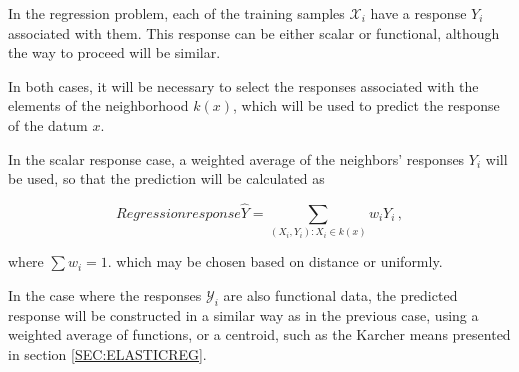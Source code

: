 In the regression problem, each of the training samples $\mathcal{X}_i$ have a
response $Y_i$ associated with them. This response can be either scalar or
functional, although the way to proceed will be similar.

In both cases, it will be necessary to select the responses associated with the
elements of the neighborhood $k(x)$, which will be used to predict the response
of the datum $x$.

In the scalar response case, a weighted average of the neighbors’ responses
$Y_i$ will be used, so that  the prediction will be calculated as

\begin{equation}{Regression response}
\hat Y = \sum_{(X_i, Y_i) : X_i \in k(x)} w_i Y_i \, ,
\end{equation}

where $\sum w_i = 1$.
which may be chosen based on distance or uniformly.

In the case where the responses $\mathcal{Y}_i$ are also functional data,
the predicted response will be constructed in a similar way as in the previous
case, using a weighted average of functions, or a centroid, such as the
Karcher means presented in section \ref{SEC:ELASTICREG}.
